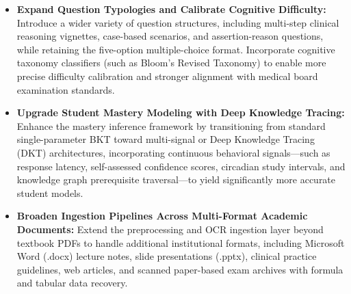 \begin{itemize}
    \item \textbf{Expand Question Typologies and Calibrate Cognitive Difficulty:}
          Introduce a wider variety of question structures, including multi-step clinical reasoning vignettes, case-based scenarios, and assertion-reason questions, while retaining the five-option multiple-choice format. Incorporate cognitive taxonomy classifiers (such as Bloom's Revised Taxonomy) to enable more precise difficulty calibration and stronger alignment with medical board examination standards.

    \item \textbf{Upgrade Student Mastery Modeling with Deep Knowledge Tracing:}
          Enhance the mastery inference framework by transitioning from standard single-parameter BKT toward multi-signal or Deep Knowledge Tracing (DKT) architectures, incorporating continuous behavioral signals---such as response latency, self-assessed confidence scores, circadian study intervals, and knowledge graph prerequisite traversal---to yield significantly more accurate student models.

    \item \textbf{Broaden Ingestion Pipelines Across Multi-Format Academic Documents:}
          Extend the preprocessing and OCR ingestion layer beyond textbook PDFs to handle additional institutional formats, including Microsoft Word (.docx) lecture notes, slide presentations (.pptx), clinical practice guidelines, web articles, and scanned paper-based exam archives with formula and tabular data recovery.
\end{itemize}
